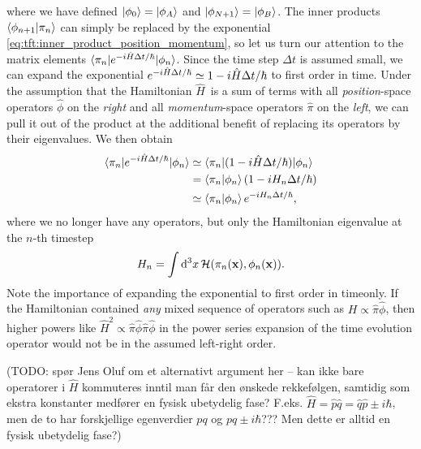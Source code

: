where we have defined $\ket{\phi_0} = \ket{\phi_A}$ and $\ket{\phi_{N+1}} = \ket{\phi_B}$.
The inner products $\braket{\phi_{n+1} | \pi_n}$ can simply be replaced by the exponential \eqref{eq:tft:inner_product_position_momentum}, so let us turn our attention to the matrix elements $\braket{\pi_n | e^{- i \hat{H} \Delta t / \hbar} | \phi_n}$.
Since the time step $\Delta t$ is assumed small, we can expand the exponential $e^{- i \hat{H} \Delta t / \hbar} \simeq 1 - i \hat{H} \Delta t / \hbar$ to first order in time.
Under the assumption that the Hamiltonian $\hat{H}$ is a sum of terms with all \emph{position}-space operators $\hat{\phi}$ on the \emph{right} and all \emph{momentum}-space operators $\hat{\pi}$ on the \emph{left}, we can pull it out of the product at the additional benefit of replacing its operators by their eigenvalues.
We then obtain
\begin{equation}
\begin{split}
	\braket{\pi_n | e^{- i \hat{H} \Delta t / \hbar} | \phi_n} &\simeq \braket{\pi_n | (1 - i \hat{H} \Delta t / \hbar) | \phi_n} \\
	                                                   &=       \braket{\pi_n | \phi_n} (1 - i H_n \Delta t / \hbar) \\
	                                                   &\simeq \braket{\pi_n | \phi_n} e^{- i H_n \Delta t / \hbar}, \\
\end{split}
\label{eq:tft:path_integral_hamiltonian_assumption}
\end{equation}
where we no longer have any operators, but only the Hamiltonian eigenvalue at the $n$-th timestep
\begin{equation}
	H_n = \int \mathop{}\!\mathrm{d}^3 x \, \mathcal{H}(\pi_n(\mathbf{x}), \phi_n(\mathbf{x})) .
\label{eq:tft:hamiltonian_eigenvalues}
\end{equation}
Note the importance of expanding the exponential to first order in timeonly.
If the Hamiltonian contained \emph{any} mixed sequence of operators such as $H \propto \hat{\pi} \hat{\phi}$, then higher powers like $\hat{H}^2 \propto \hat{\pi} \hat{\phi} \hat{\pi} \hat{\phi}$ in the power series expansion of the time evolution operator would not be in the assumed left-right order.

(TODO: spør Jens Oluf om et alternativt argument her -- kan ikke bare operatorer i $\hat{H}$ kommuteres inntil man får den ønskede rekkefølgen, samtidig som ekstra konstanter medfører en fysisk ubetydelig fase? F.eks. $\hat{H} = \hat{p} \hat{q} = \hat{q} \hat{p} \pm i \hbar$, men de to har forskjellige egenverdier $pq$ og $pq \pm i \hbar$??? Men dette er alltid en fysisk ubetydelig fase?)

